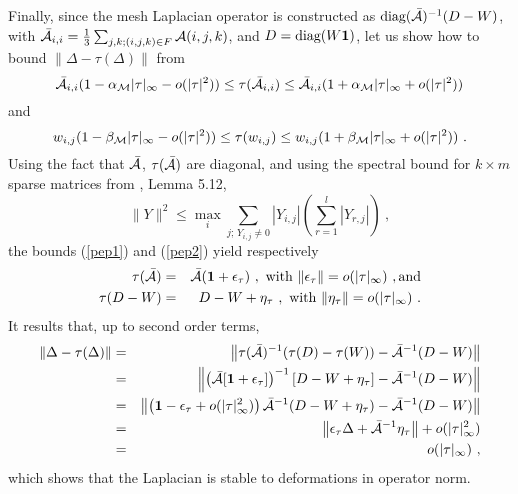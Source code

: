 Finally, since the mesh Laplacian operator is constructed as $\text{diag}(\bar{{\mathcal A}})^{-1} (D - W)$, 
with $\bar{{\mathcal A}}_{i,i} = \frac{1}{3} \sum_{j,k; (i,j,k) \in F} {\mathcal A}(i,j,k)$, and $D = \text{diag}( W {\bf 1})$,
let us show how to bound $\| \Delta - \tau(\Delta) \|$ from
\begin{equation}
\label{pep1}
\bar{{\mathcal A}}_{i,i} ( 1 - \alpha_{\mathcal{M}} | \tau|_\infty - o( | \tau|^2) ) \leq \tau(\bar{{\mathcal A}}_{i,i}) \leq \bar{{\mathcal A}}_{i,i} ( 1 + \alpha_{\mathcal{M}} | \tau|_\infty + o( | \tau|^2) )
\end{equation} 
and
\begin{equation}
\label{pep2}
w_{i,j} ( 1 - \beta_{\mathcal{M}} | \tau|_\infty - o( | \tau|^2) ) \leq \tau(w_{i,j}) \leq w_{i,j} ( 1 + \beta_{\mathcal{M}} | \tau|_\infty + o( | \tau|^2) )~.
\end{equation} 
Using the fact that $\bar{{\mathcal A}}$, $\tau(\bar{{\mathcal A}})$ are diagonal, and using the spectral bound for $k \times m$ sparse matrices 
from \cite{splitting}, Lemma 5.12, 
$$\| Y \|^2 \leq \max_i \sum_{j ; \, Y_{i,j} \neq 0} |Y_{i,j}| \left( \sum_{r=1}^l | Y_{r,j}| \right)~, $$
the bounds (\ref{pep1}) and (\ref{pep2}) 
yield respectively 
\begin{eqnarray*}
\label{pep3}
 \tau(\bar{{\mathcal A}}) &=& \bar{{\mathcal A}} ( {\bf 1} + \epsilon_\tau)~,~\text{with } \| \epsilon_\tau \| = o( | \tau|_\infty)~,\text{and}  \\
 \tau( D - W) &=& D - W + \eta_\tau~,~\text{with } \| \eta_\tau \| = o ( | \tau|_\infty )~.
\end{eqnarray*}
It results that, up to second order terms, 
\begin{eqnarray*}
\| \Delta - \tau(\Delta) \| &=& \left \| \tau(\bar{{\mathcal A}})^{-1} ( \tau(D) - \tau(W) ) - \bar{{\mathcal A}}^{-1} ( D - W) \right\| \\
&=& \left \| \left( \bar{{\mathcal A}} [{\bf 1} + \epsilon_\tau ] \right)^{-1} \left[ D - W + \eta_\tau \right] - \bar{{\mathcal A}}^{-1} ( D - W) \right\| \\
&=& \left \| \left( {\bf 1} - \epsilon_\tau + o(|\tau|_\infty^2) \right) \bar{{\mathcal A}}^{-1} ( D - W + \eta_\tau) - \bar{{\mathcal A}}^{-1} ( D - W)  \right\| \\
&=& \left \| \epsilon_\tau \Delta + \bar{{\mathcal A}}^{-1} \eta_\tau \right\| + o( | \tau |_\infty^2) \\ 
&=& o( | \tau|_\infty)~,
\end{eqnarray*}
which shows that the Laplacian is stable to deformations in operator norm. 
